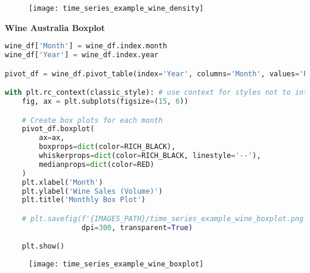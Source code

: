 \begin{figure}[h!]
  \centering
  \texttt{[image: time\_series\_example\_wine\_density]}
\end{figure}\newpage


{\noindent\hspace{-12.5pt}\normalsize\bfseries Wine Australia Boxplot}\vspace{-10pt}
\begin{center}
  \begin{lstlisting}[language=Python, 
  caption={Распределения продаж красного вина в Австралии по месяцам в период с 1980 по 1996 года.}, 
  label={lst:time_series_example_wine_boxplot}]
wine_df['Month'] = wine_df.index.month
wine_df['Year'] = wine_df.index.year

pivot_df = wine_df.pivot_table(index='Year', columns='Month', values='Red')

with plt.rc_context(classic_style): # use context for styles not to interfere
    fig, ax = plt.subplots(figsize=(15, 6))

    # Create box plots for each month
    pivot_df.boxplot(
        ax=ax,
        boxprops=dict(color=RICH_BLACK),
        whiskerprops=dict(color=RICH_BLACK, linestyle='--'),
        medianprops=dict(color=RED)
    )
    plt.xlabel('Month')
    plt.ylabel('Wine Sales (Volume)')
    plt.title('Monthly Box Plot')

    # plt.savefig(f'{IMAGES_PATH}/time_series_example_wine_boxplot.png', 
                  dpi=300, transparent=True)

    plt.show()
  \end{lstlisting}
\end{center}

\begin{figure}[h!]
  \centering
  \texttt{[image: time\_series\_example\_wine\_boxplot]}
\end{figure}\newpage


